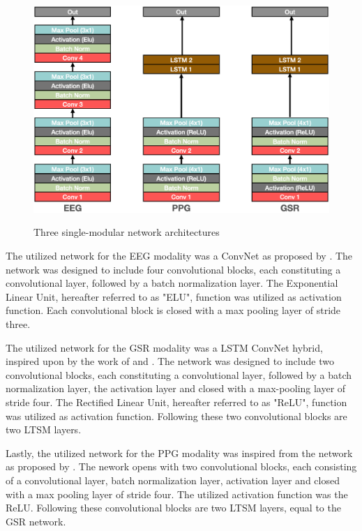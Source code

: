 \documentclass[12pt]{article}
\begin{document}
\begin{figure}
\caption{Three single-modular network architectures}
\bigskip
\includegraphics[scale=0.725]{single_model_architecture}
\label{fig:singlearchitecture}
\end{figure}

The utilized network for the EEG modality was a ConvNet as proposed by . The network was designed to include four convolutional blocks, each constituting a convolutional layer, followed by a batch normalization layer. The Exponential Linear Unit, hereafter referred to as "ELU", function was utilized as activation function. Each convolutional block is closed with a max pooling layer of stride three.

The utilized network for the GSR modality was a LSTM ConvNet hybrid, inspired upon by the work of  and . The network was designed to include two convolutional blocks, each constituting a convolutional layer, followed by a batch normalization layer, the activation layer and closed with a max-pooling layer of stride four. The Rectified Linear Unit, hereafter referred to as "ReLU", function was utilized as activation function. Following these two convolutional blocks are two LTSM layers.

Lastly, the utilized network for the PPG modality was inspired from the network as proposed by . The nework opens with two convolutional blocks, each consisting of a convolutional layer, batch normalization layer, activation layer and closed with a max pooling layer of stride four. The utilized activation function was the ReLU. Following these convolutional blocks are two LTSM layers, equal to the GSR network. 
\end{document}
